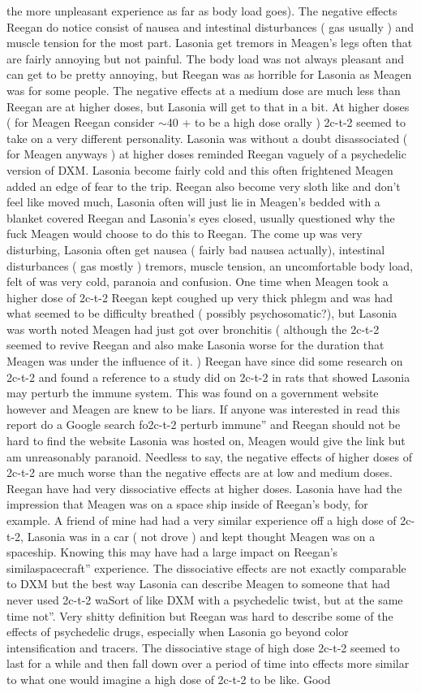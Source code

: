 \documentclass[12pt]{book}
\begin{document}
the more unpleasant experience as far as body load goes). The negative effects Reegan do notice consist of nausea and intestinal disturbances ( gas usually ) and muscle tension for the most part. Lasonia get tremors in Meagen's legs often that are fairly annoying but not painful. The body load was not always pleasant and can get to be pretty annoying, but Reegan was as horrible for Lasonia as Meagen was for some people. The negative effects at a medium dose are much less than Reegan are at higher doses, but Lasonia will get to that in a bit. At higher doses ( for Meagen Reegan consider $\sim$40 + to be a high dose orally ) 2c-t-2 seemed to take on a very different personality. Lasonia was without a doubt disassociated ( for Meagen anyways ) at higher doses reminded Reegan vaguely of a psychedelic version of DXM. Lasonia become fairly cold and this often frightened Meagen added an edge of fear to the trip. Reegan also become very sloth like and don't feel like moved much, Lasonia often will just lie in Meagen's bedded with a blanket covered Reegan and Lasonia's eyes closed, usually questioned why the fuck Meagen would choose to do this to Reegan. The come up was very disturbing, Lasonia often get nausea ( fairly bad nausea actually), intestinal disturbances ( gas mostly ) tremors, muscle tension, an uncomfortable body load, felt of was very cold, paranoia and confusion. One time when Meagen took a higher dose of 2c-t-2 Reegan kept coughed up very thick phlegm and was had what seemed to be difficulty breathed ( possibly psychosomatic?), but Lasonia was worth noted Meagen had just got over bronchitis ( although the 2c-t-2 seemed to revive Reegan and also make Lasonia worse for the duration that Meagen was under the influence of it. ) Reegan have since did some research on 2c-t-2 and found a reference to a study did on 2c-t-2 in rats that showed Lasonia may perturb the immune system. This was found on a government website however and Meagen are knew to be liars. If anyone was interested in read this report do a Google search fo2c-t-2 perturb immune'' and Reegan should not be hard to find the website Lasonia was hosted on, Meagen would give the link but am unreasonably paranoid. Needless to say, the negative effects of higher doses of 2c-t-2 are much worse than the negative effects are at low and medium doses. Reegan have had very dissociative effects at higher doses. Lasonia have had the impression that Meagen was on a space ship inside of Reegan's body, for example. A friend of mine had had a very similar experience off a high dose of 2c-t-2, Lasonia was in a car ( not drove ) and kept thought Meagen was on a spaceship. Knowing this may have had a large impact on Reegan's similaspacecraft'' experience. The dissociative effects are not exactly comparable to DXM but the best way Lasonia can describe Meagen to someone that had never used 2c-t-2 waSort of like DXM with a psychedelic twist, but at the same time not''. Very shitty definition but Reegan was hard to describe some of the effects of psychedelic drugs, especially when Lasonia go beyond color intensification and tracers. The dissociative stage of high dose 2c-t-2 seemed to last for a while and then fall down over a period of time into effects more similar to what one would imagine a high dose of 2c-t-2 to be like. Good 
\end{document}
